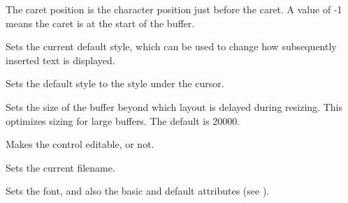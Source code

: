 
The caret position is the character position just before the caret.
A value of -1 means the caret is at the start of the buffer.

\label{wxrichtextctrlsetdefaultstyle}


Sets the current default style, which can be used to change how subsequently inserted
text is displayed.

\label{wxrichtextctrlsetdefaultstyletocursorstyle}


Sets the default style to the style under the cursor.

\label{wxrichtextctrlsetdelayedlayoutthreshold}


Sets the size of the buffer beyond which layout is delayed during resizing.
This optimizes sizing for large buffers. The default is 20000.

\label{wxrichtextctrlseteditable}


Makes the control editable, or not.

\label{wxrichtextctrlsetfilename}


Sets the current filename.

\label{wxrichtextctrlsetfont}


Sets the font, and also the basic and default attributes (see ).

\label{wxrichtextctrlsethandlerflags}


